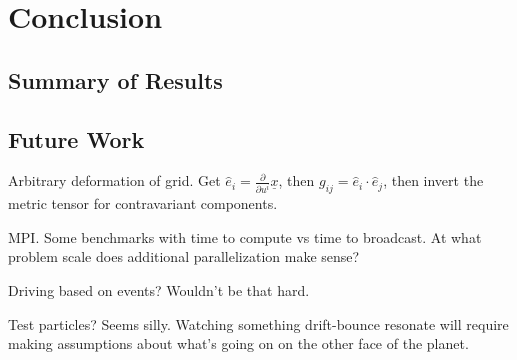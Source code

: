 
\chapter{Conclusion}
  \label{ch_conclusion}

\section{Summary of Results}


\section{Future Work}

Arbitrary deformation of grid. Get $\hat{e}_i = \frac{\partial}{\partial u^i} \underline{x}$, then $g_{ij} = \hat{e}_i \cdot \hat{e}_j$, then invert the metric tensor for contravariant components.  

MPI. Some benchmarks with time to compute vs time to broadcast. At what problem scale does additional parallelization make sense? 

Driving based on events? Wouldn't be that hard. 

Test particles? Seems silly. Watching something drift-bounce resonate will require making assumptions about what's going on on the other face of the planet.  

